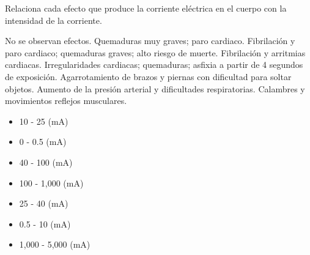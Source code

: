 Relaciona cada efecto que produce la corriente eléctrica en el cuerpo con la intensidad de la corriente.\\[1em]

\begin{minipage}{0.55\textwidth}
    \begin{parts}
        No se observan efectos.
        Quemaduras muy graves; paro cardiaco.
        Fibrilación y paro cardiaco; quemaduras graves; alto riesgo de muerte.
        Fibrilación y arritmias cardiacas.
        Irregularidades cardiacas; quemaduras; asfixia a partir de 4 segundos de exposición.
        Agarrotamiento de brazos y piernas con dificultad para soltar objetos. Aumento de la presión arterial y dificultades respiratorias.
        Calambres y movimientos reflejos musculares.
    \end{parts}
\end{minipage}\hfill
\begin{minipage}{0.35\textwidth}
    \begin{itemize}
        \item[{\fillin[F][1cm]}] 10 - 25       (mA) \\[-1ex]
        \item[{\fillin[A][1cm]}] 0 - 0.5       (mA) \\[-1ex]
        \item[{\fillin[D][1cm]}] 40 - 100      (mA) \\[-1ex]
        \item[{\fillin[C][1cm]}] 100 - 1,000    (mA)\\[-1ex]
        \item[{\fillin[E][1cm]}] 25 - 40       (mA) \\[-1ex]
        \item[{\fillin[G][1cm]}] 0.5 - 10      (mA) \\[-1ex]
        \item[{\fillin[B][1cm]}] 1,000 - 5,000 (mA) \\[-1ex]
    \end{itemize}
\end{minipage}